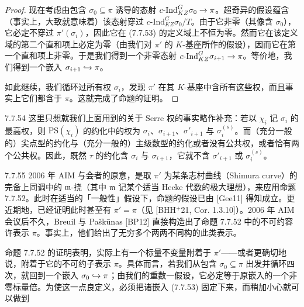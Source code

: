 \begin{proof}
现在考虑由包含 $\sigma_0\subseteq\pi$ 诱导的态射 $c\text{-}\mathrm{Ind}_{KZ}^G\sigma_0\rightarrow\pi$。超奇异的假设蕴含（事实上，大致就意味着）该态射穿过 $c\text{-}\mathrm{Ind}_{KZ}^G\sigma_0/T$。由于它非零（其像含 $\sigma_0$），它必定不穿过 $\pi'(\sigma_i)$，因此它在 (7.7.53) 的定义域上不恒为零。然而它在该定义域的第二个直和项上必定为零（由我们对 $\pi'$ 的 $K$-基座所作的假设），因而它在第一个直和项上非零。于是我们得到一个非零态射 $c\text{-}\mathrm{Ind}_{KZ}^G\sigma_{i+1}\rightarrow\pi$。等价地，我们得到一个嵌入 $\sigma_{i+1}\hookrightarrow\pi$。

如此继续，我们循环过所有权 $\sigma_i$，发现 $\pi'$ 在其 $K$-基座中含所有这些权，而且事实上它们都含于 $\pi$。这就完成了命题的证明。
\end{proof}

\begin{rem}{7.7.54}\label{rem:a4-7-7-54}
这里只想就我们上面用到的关于 Serre 权的事实略作补充：若以 $\chi_i$ 记 $\sigma_i$ 的最高权，则 $\mathrm{PS}(\chi_i)$ 的约化中的权为 $\sigma_i$、$\sigma_{i+1}$、$\sigma'_{i+1}$ 与 $\sigma_i^{(s)}$。而（充分一般的）尖点型的约化与（充分一般的）主级数型的约化或者没有公共权，或者恰有两个公共权。因此，既然 $\tau$ 的约化含 $\sigma_i$ 与 $\sigma_{i+1}$，它就不含 $\sigma'_{i+1}$ 或 $\sigma_i^{(s)}$。
\end{rem}

\begin{rem}{7.7.55}\label{rem:a4-7-7-55}
2006 年 AIM 与会者的原意，是取 $\pi'$ 为某条志村曲线（Shimura curve）的完备上同调中的 $\mathfrak m$-挠（其中 $\mathfrak m$ 记某个适当 Hecke 代数的极大理想），来应用命题 7.7.52。此时在适当的「一般性」假设下，命题的假设已由 [Gee11] 得知成立。更近期地，已经证明此时甚至有 $\pi'=\pi$（见 [BHH${}^{+}$21, Cor. 1.3.10]）。2006 年 AIM 会议后不久，Breuil 与 Pa\v{s}k\={u}nas [BP12] 直接构造出了命题 7.7.52 中的不可约容许表示 $\pi$。事实上，他们给出了无穷多个两两不同构的此类表示。
\end{rem}

命题 7.7.52 的证明表明，实际上有一个标量不变量附着于 $\pi'$——或者更确切地说，附着于它的不可约子表示 $\pi$。具体而言，若我们从包含 $\sigma_0\subseteq\pi$ 出发并循环四次，就回到一个嵌入 $\sigma_0\hookrightarrow\pi$；由我们的重数一假设，它必定等于原嵌入的一个非零标量倍。为使这一点良定义，必须把诸嵌入 (7.7.53) 固定下来，而稍加小心就可以做到

